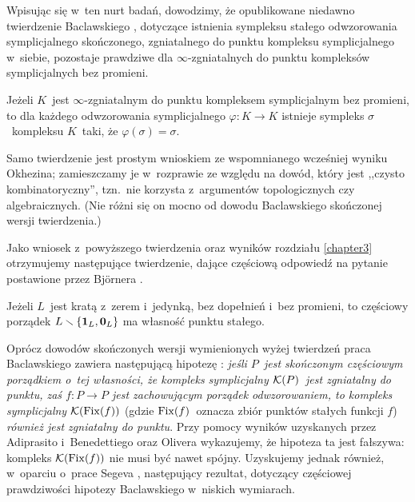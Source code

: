 Wpisując się w~ten nurt badań, dowodzimy, że opublikowane niedawno twierdzenie Baclawskiego \cite[Theorem 32]{Baclawski12}, dotyczące istnienia sympleksu stałego odwzorowania symplicjalnego skończonego, zgniatalnego do punktu kompleksu symplicjalnego w~siebie, pozostaje prawdziwe dla $\infty$-zgniatalnych do punktu kompleksów symplicjalnych bez promieni.

\begin{tw*}[\ref{tw-baclawskiego_o_punkcie_stalym}]
Jeżeli $K$~jest $\infty$-zgniatalnym do punktu kompleksem symplicjalnym bez promieni, to dla każdego odwzorowania symplicjalnego $\varphi\colon K\to K$ istnieje sympleks $\sigma$~kompleksu $K$~taki, że $\varphi(\sigma)=\sigma$.
\end{tw*}

Samo twierdzenie jest prostym wnioskiem ze wspomnianego wcześniej wyniku Okhezina; zamieszczamy je w~rozprawie ze względu na dowód, który jest ,,czysto kombinatoryczny'', tzn.~nie korzysta z~argumentów topologicznych czy algebraicznych. (Nie różni się on mocno od dowodu Baclawskiego \cite{Baclawski12} skończonej wersji twierdzenia.)

Jako wniosek z~powyższego twierdzenia oraz wyników rozdziału \ref{chapter3} otrzymujemy następujące twierdzenie, dające częściową odpowiedź na pytanie postawione przez Bj{\"o}rnera \cite[s.~98]{Bjorner81}.

\begin{tw*}[\ref{wn-o_fpp_dla_krat}]
Jeżeli $L$~jest kratą z~zerem i~jedynką, bez dopełnień i~bez promieni, to częściowy porządek $L\smallsetminus\{\mathbf{1}_L,\mathbf{0}_L\}$ ma własność punktu stałego.
\end{tw*}

Oprócz dowodów skończonych wersji wymienionych wyżej twierdzeń praca Baclawskiego zawiera następującą hipotezę \cite[Conjecture 34]{Baclawski12}: \textit{jeśli $P$~jest skończonym częściowym porządkiem o~tej własności, że kompleks symplicjalny $\mathcal{K}(P)$~jest zgniatalny do punktu, zaś $f\colon P\to P$ jest zachowującym porządek odwzorowaniem, to kompleks symplicjalny $\mathcal{K}(\operatorname{Fix}(f))$} (gdzie $\operatorname{Fix}(f)$~oznacza zbiór punktów stałych funkcji $f$) \textit{również jest zgniatalny do punktu}. Przy pomocy wyników uzyskanych przez Adiprasito i~Benedettiego \cite{Adiprasito13a} oraz Olivera \cite{Oliver75} wykazujemy, że hipoteza ta jest fałszywa: kompleks $\mathcal{K}(\operatorname{Fix}(f))$ nie musi być nawet spójny. Uzyskujemy jednak również, w~oparciu o~prace Segeva \cite{Segev93,Segev94}, następujący rezultat, dotyczący częściowej prawdziwości hipotezy Baclawskiego w~niskich wymiarach.

